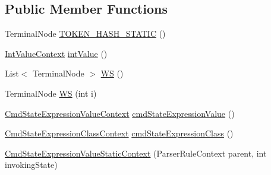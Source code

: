 \subsection*{Public Member Functions}
\begin{DoxyCompactItemize}
\item 
Terminal\+Node \hyperlink{classgov_1_1nasa_1_1jpf_1_1inspector_1_1server_1_1expression_1_1parser_1_1_expression_grammar_pa08e6165e66cacb4d3382a343315ee767_aac67d86f670640307e5d8df5b93f5436}{T\+O\+K\+E\+N\+\_\+\+H\+A\+S\+H\+\_\+\+S\+T\+A\+T\+IC} ()
\item 
\hyperlink{classgov_1_1nasa_1_1jpf_1_1inspector_1_1server_1_1expression_1_1parser_1_1_expression_grammar_parser_1_1_int_value_context}{Int\+Value\+Context} \hyperlink{classgov_1_1nasa_1_1jpf_1_1inspector_1_1server_1_1expression_1_1parser_1_1_expression_grammar_pa08e6165e66cacb4d3382a343315ee767_a0875826cd329524526d9871a60ed67e4}{int\+Value} ()
\item 
List$<$ Terminal\+Node $>$ \hyperlink{classgov_1_1nasa_1_1jpf_1_1inspector_1_1server_1_1expression_1_1parser_1_1_expression_grammar_pa08e6165e66cacb4d3382a343315ee767_ad81b5e4d9dd7cc44de6a6145e872f553}{WS} ()
\item 
Terminal\+Node \hyperlink{classgov_1_1nasa_1_1jpf_1_1inspector_1_1server_1_1expression_1_1parser_1_1_expression_grammar_pa08e6165e66cacb4d3382a343315ee767_a17f564d16a4c3c36a7324c636612a7e7}{WS} (int i)
\item 
\hyperlink{classgov_1_1nasa_1_1jpf_1_1inspector_1_1server_1_1expression_1_1parser_1_1_expression_grammar_pa17ff9e538e96e94398ba5af02b5ffa30}{Cmd\+State\+Expression\+Value\+Context} \hyperlink{classgov_1_1nasa_1_1jpf_1_1inspector_1_1server_1_1expression_1_1parser_1_1_expression_grammar_pa08e6165e66cacb4d3382a343315ee767_a6d6c10da0dae623360bb4d3279302ce4}{cmd\+State\+Expression\+Value} ()
\item 
\hyperlink{classgov_1_1nasa_1_1jpf_1_1inspector_1_1server_1_1expression_1_1parser_1_1_expression_grammar_pa672388ef0800b4a3d173ab7548f6b406}{Cmd\+State\+Expression\+Class\+Context} \hyperlink{classgov_1_1nasa_1_1jpf_1_1inspector_1_1server_1_1expression_1_1parser_1_1_expression_grammar_pa08e6165e66cacb4d3382a343315ee767_a3044e5ba6d7172c2b1d16cb0341ecfdd}{cmd\+State\+Expression\+Class} ()
\item 
\hyperlink{classgov_1_1nasa_1_1jpf_1_1inspector_1_1server_1_1expression_1_1parser_1_1_expression_grammar_pa08e6165e66cacb4d3382a343315ee767_ad91db68e91d90c1445dffe81d8760511}{Cmd\+State\+Expression\+Value\+Static\+Context} (Parser\+Rule\+Context parent, int invoking\+State)

\end{DoxyCompactItemize}
